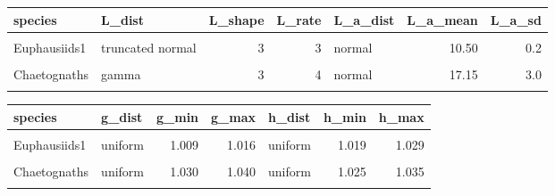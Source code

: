 \documentclass[
]{article}
\begin{document}
\begin{table}[H]
\centering
\begin{tabular}{llrrlrr}
\toprule
species & L\_dist & L\_shape & L\_rate & L\_a\_dist & L\_a\_mean & L\_a\_sd\\
\midrule
\cellcolor{gray!6}{copepod} & \cellcolor{gray!6}{gamma} & \cellcolor{gray!6}{7} & \cellcolor{gray!6}{4} & \cellcolor{gray!6}{normal} & \cellcolor{gray!6}{2.80} & \cellcolor{gray!6}{0.2}\\
Euphausiids1 & truncated normal & 3 & 3 & normal & 10.50 & 0.2\\
\cellcolor{gray!6}{Euphausiids2} & \cellcolor{gray!6}{truncated normal} & \cellcolor{gray!6}{20} & \cellcolor{gray!6}{4} & \cellcolor{gray!6}{normal} & \cellcolor{gray!6}{10.50} & \cellcolor{gray!6}{1.0}\\
Chaetognaths & gamma & 3 & 4 & normal & 17.15 & 3.0\\
\cellcolor{gray!6}{Appendicularians} & \cellcolor{gray!6}{gamma} & \cellcolor{gray!6}{4} & \cellcolor{gray!6}{4} & \cellcolor{gray!6}{normal} & \cellcolor{gray!6}{4.00} & \cellcolor{gray!6}{1.0}\\
\bottomrule
\end{tabular}
\end{table}

\begin{table}[H]
\centering
\begin{tabular}{llrrlrr}
\toprule
species & g\_dist & g\_min & g\_max & h\_dist & h\_min & h\_max\\
\midrule
\cellcolor{gray!6}{copepod} & \cellcolor{gray!6}{uniform} & \cellcolor{gray!6}{1.015} & \cellcolor{gray!6}{1.025} & \cellcolor{gray!6}{uniform} & \cellcolor{gray!6}{1.027} & \cellcolor{gray!6}{1.030}\\
Euphausiids1 & uniform & 1.009 & 1.016 & uniform & 1.019 & 1.029\\
\cellcolor{gray!6}{Euphausiids2} & \cellcolor{gray!6}{uniform} & \cellcolor{gray!6}{1.009} & \cellcolor{gray!6}{1.016} & \cellcolor{gray!6}{uniform} & \cellcolor{gray!6}{1.019} & \cellcolor{gray!6}{1.029}\\
Chaetognaths & uniform & 1.030 & 1.040 & uniform & 1.025 & 1.035\\
\cellcolor{gray!6}{Appendicularians} & \cellcolor{gray!6}{uniform} & \cellcolor{gray!6}{0.979} & \cellcolor{gray!6}{0.999} & \cellcolor{gray!6}{uniform} & \cellcolor{gray!6}{1.016} & \cellcolor{gray!6}{1.018}\\
\bottomrule
\end{tabular}
\end{table}
\end{document}

